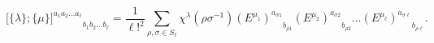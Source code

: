\begin{equation}
	{{[} {\{} \lambda {\}};{\{} \mu 
	{\}}{]}^{a_{1}a_{2}\ldots a_{\ell}}}_{b_{1}b_{2}\ldots b_{\ell}} = 
	\frac{1}{\ell ! ^{2}}\sum_{\rho, \sigma \in S_{\ell}} \chi^{\lambda}(\rho 
	\sigma^{-1}) {(E^{\mu_{1}})^{a_{\sigma 1}}}_{b_{\rho 1}} 
	{(E^{\mu_{2}})^{a_{\sigma 2}}}_{b_{\rho 2}} \ldots 
	{(E^{\mu_{\ell}})^{a_{\sigma \ell}}}_{b_{\rho \ell}}.
	\label{eq:PermanentDefn}
\end{equation}

